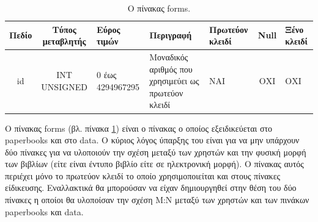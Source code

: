 \documentclass{assignment}
\begin{document}
\begin{landscape}
\begin{table}[htbp]
\begin{center}
  \begin{tabular}{|c|c|m{}|m{}|m{2.0cm}|c|m{1.5cm}|}
    \hline
    {\bf Πεδίο} & {\bf Τύπος μεταβλητής} & {\bf Εύρος τιμών} & {\bf Περιγραφή} & {\bf Πρωτεύον κλειδί} & {\bf Null} & {\bf Ξένο κλειδί} \\ \hline
    id & INT UNSIGNED & 0 έως 4294967295 & Μοναδικός αριθμός που χρησιμεύει ως πρωτεύον κλειδί & ΝΑΙ & ΟΧΙ & ΟΧΙ \\ \hline
  \end{tabular}
\caption{Ο πίνακας forms.}
\label{table:db_table:forms}
\end{center}
\end{table}

Ο πίνακας forms (βλ. πίνακα \ref{table:db_table:forms}) είναι ο πίνακας ο οποίος εξειδικεύεται στο  paperbooks και στο data. Ο κύριος λόγος ύπαρξης του είναι για να μην υπάρχουν δύο πίνακες για να υλοποιούν την σχέση μεταξύ των χρηστών και την φυσική μορφή των βιβλίων (είτε είναι έντυπο βιβλίο είτε σε ηλεκτρονική μορφή). Ο πίνακας αυτός περιέχει μόνο το πρωτεύον κλειδί το οποίο χρησιμοποιείται και στους πίνακες είδικευσης. Εναλλακτικά θα μπορούσαν να είχαν δημιουργηθεί στην θέση του δύο πίνακες η οποίοι θα υλοποίσαν την σχέση Μ:Ν μεταξύ των χρηστών και των πινάκων paperbooks και data.
\end{landscape}
\end{document}
